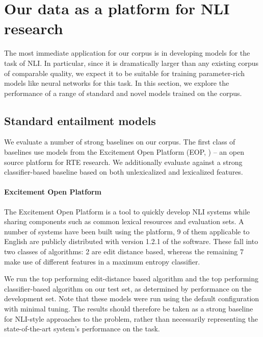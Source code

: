 \section{Our data as a platform for NLI research}

The most immediate application for our corpus is in developing models for the task of NLI. In particular, since it is dramatically larger than any existing corpus of comparable quality, we expect it to be suitable for training  parameter-rich models like neural networks for this task. In this section, we explore the performance of a range of standard and novel models trained on the corpus.

\subsection{Standard entailment models}
We evaluate a number of strong baselines on our corpus.
The first class of baselines use models from the Excitement Open
  Platform (EOP,
  \citealt{pado2014design,magnini2014excitement})
  -- an open source platform for RTE research.
We additionally evaluate against a strong classifier-based baseline based on
  both  unlexicalized and lexicalized features.

%
%
\paragraph{Excitement Open Platform}
The Excitement Open Platform is a tool to quickly develop NLI systems
  while sharing components such as common lexical resources and 
  evaluation sets.
A number of systems have been built using the platform, 9 of them
  applicable to English are publicly distributed with version 1.2.1
  of the software.
These fall into two classes of algorithms: 2 are edit distance based,
  whereas the remaining 7 make use of different features in a
  maximum entropy classifier.

We run the top performing edit-distance based algorithm and the top
  performing classifier-based algorithm on our test set, as
  determined by performance on the development set.
Note that these models were run using the default configuration
  with minimal tuning.
The results should therefore be taken as a strong baseline for
  NLI-style approaches to the problem, rather than necessarily
  representing the state-of-the-art system's performance on the
  task.

